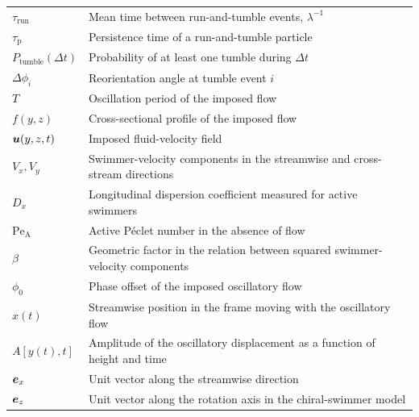 \begin{longtable}{p{3cm}p{11cm}}
$\tau_\mathrm{run}$ & Mean time between run-and-tumble events, $\lambda^{-1}$ \\
$\tau_\mathrm{p}$ & Persistence time of a run-and-tumble particle \\
$P_\mathrm{tumble}(\Delta t)$ & Probability of at least one tumble during $\Delta t$ \\
$\Delta\phi_i$ & Reorientation angle at tumble event $i$ \\
$T$ & Oscillation period of the imposed flow \\
$f(y,z)$ & Cross-sectional profile of the imposed flow \\
$\bm{u}(y,z,t)$ & Imposed fluid-velocity field \\
$V_x,V_y$ & Swimmer-velocity components in the streamwise and cross-stream directions \\
$D_x$ & Longitudinal dispersion coefficient measured for active swimmers \\
$\mathrm{Pe}_\mathrm{A}$ & Active Péclet number in the absence of flow \\
$\beta$ & Geometric factor in the relation between squared swimmer-velocity components \\
$\phi_0$ & Phase offset of the imposed oscillatory flow \\
$\hat x(t)$ & Streamwise position in the frame moving with the oscillatory flow \\
$A[y(t),t]$ & Amplitude of the oscillatory displacement as a function of height and time \\
$\bm{e}_x$ & Unit vector along the streamwise direction \\
$\bm{e}_z$ & Unit vector along the rotation axis in the chiral-swimmer model \\
\hline
\end{longtable}
